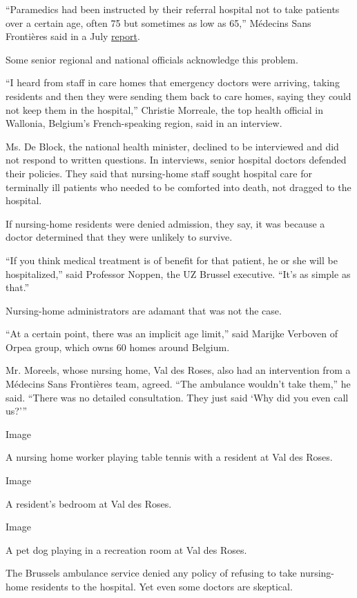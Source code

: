 ``Paramedics had been instructed by their referral hospital not to take
patients over a certain age, often 75 but sometimes as low as 65,''
Médecins Sans Frontières said in a July
\href{https://www.msf.org/sites/msf.org/files/2020-07/Left\%20behind\%20-\%20MSF\%20care\%20homes\%20in\%20Belgium\%20report.pdf}{report}.

Some senior regional and national officials acknowledge this problem.

``I heard from staff in care homes that emergency doctors were arriving,
taking residents and then they were sending them back to care homes,
saying they could not keep them in the hospital,'' Christie Morreale,
the top health official in Wallonia, Belgium's French-speaking region,
said in an interview.

Ms. De Block, the national health minister, declined to be interviewed
and did not respond to written questions. In interviews, senior hospital
doctors defended their policies. They said that nursing-home staff
sought hospital care for terminally ill patients who needed to be
comforted into death, not dragged to the hospital.

If nursing-home residents were denied admission, they say, it was
because a doctor determined that they were unlikely to survive.

``If you think medical treatment is of benefit for that patient, he or
she will be hospitalized,'' said Professor Noppen, the UZ Brussel
executive. ``It's as simple as that.''

Nursing-home administrators are adamant that was not the case.

``At a certain point, there was an implicit age limit,'' said Marijke
Verboven of Orpea group, which owns 60 homes around Belgium.

Mr. Moreels, whose nursing home, Val des Roses, also had an intervention
from a Médecins Sans Frontières team, agreed. ``The ambulance wouldn't
take them,'' he said. ``There was no detailed consultation. They just
said `Why did you even call us?'''

Image

A nursing home worker playing table tennis with a resident at Val des
Roses.

Image

A resident's bedroom at Val des Roses.

Image

A pet dog playing in a recreation room at Val des Roses.

The Brussels ambulance service denied any policy of refusing to take
nursing-home residents to the hospital. Yet even some doctors are
skeptical.

